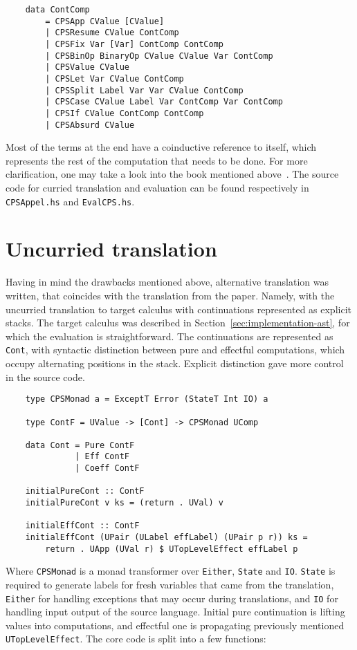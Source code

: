 \documentclass[declaration,shortabstract]{iithesis}
\theoremstyle{definition} \newtheorem{definition}{Definition}[chapter]
\theoremstyle{remark} \newtheorem{remark}[definition]{Observation}
\theoremstyle{plain} \newtheorem{theorem}[definition]{Theorem}
\theoremstyle{plain} \newtheorem{lemma}[definition]{Lemma}
\begin{document}
\begin{verbatim}
    data ContComp
        = CPSApp CValue [CValue]
        | CPSResume CValue ContComp
        | CPSFix Var [Var] ContComp ContComp
        | CPSBinOp BinaryOp CValue CValue Var ContComp
        | CPSValue CValue
        | CPSLet Var CValue ContComp
        | CPSSplit Label Var Var CValue ContComp
        | CPSCase CValue Label Var ContComp Var ContComp
        | CPSIf CValue ContComp ContComp
        | CPSAbsurd CValue
\end{verbatim}
    Most of the terms at the end have a coinductive reference to itself, which
    represents the rest of the computation that needs to be done. For more
    clarification, one may take a look into the book mentioned
    above~\cite{appel-continuations}. The source code for curried translation and
    evaluation can be found respectively in \verb!CPSAppel.hs! and
    \verb!EvalCPS.hs!.

    \section{Uncurried translation}

    Having in mind the drawbacks mentioned above, alternative translation was
    written, that coincides with the translation from the paper. Namely, with
    the uncurried translation to target calculus with continuations represented
    as explicit stacks. The target calculus was described in Section~\ref{sec:implementation-ast},
    for which the evaluation is straightforward. The continuations are represented
    as \verb!Cont!, with syntactic distinction between pure and effectful computations,
    which occupy alternating positions in the stack. Explicit distinction gave
    more control in the source code.

\begin{verbatim}
    type CPSMonad a = ExceptT Error (StateT Int IO) a

    type ContF = UValue -> [Cont] -> CPSMonad UComp

    data Cont = Pure ContF
              | Eff ContF
              | Coeff ContF

    initialPureCont :: ContF
    initialPureCont v ks = (return . UVal) v

    initialEffCont :: ContF
    initialEffCont (UPair (ULabel effLabel) (UPair p r)) ks =
        return . UApp (UVal r) $ UTopLevelEffect effLabel p
\end{verbatim}
    Where \verb!CPSMonad! is a monad transformer over \verb!Either!, \verb!State!
    and \verb!IO!. \verb!State! is required to generate labels for fresh variables
    that came from the translation, \verb!Either! for handling exceptions that
    may occur during translations, and \verb!IO! for handling input output of the
    source language. Initial pure continuation is lifting values into computations,
    and effectful one is propagating previously mentioned \verb!UTopLevelEffect!.
    The core code is split into a few functions:
\end{document}
